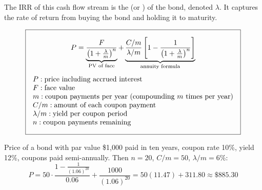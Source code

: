 \begin{center}
\end{center}

The IRR of this cash flow stream is the  (or ) of the bond, denoted $\lambda$. It captures the rate of return from buying the bond and holding it to maturity.

\[\boxed{\begin{gathered}
    P = \underbrace{\frac{F}{\left(1+\frac{\lambda}{m}\right)^n}}_{\text{PV of face}} + \underbrace{\frac{C/m}{\lambda/m}\left[1-\frac{1}{\left(1+\frac{\lambda}{m}\right)^n}\right]}_{\text{annuity formula}}\\[4pt]
    \begin{array}{@{}l@{}}
        P: \text{price including accrued interest}\\
        F: \text{face value}\\
        m: \text{coupon payments per year (compounding $m$ times per year)}\\
        C/m: \text{amount of each coupon payment}\\
        \lambda/m: \text{yield per coupon period}\\
        n: \text{coupon payments remaining}
    \end{array}
\end{gathered}}\]

\begin{example}
    Price of a bond with par value \$1,000 paid in ten years, coupon rate 10\%, yield 12\%, coupons paid semi-annually. Then $n = 20$, $C/m = 50$, $\lambda/m = 6\%$:
    \[P = 50\cdot\frac{1-\frac{1}{(1.06)^{20}}}{0.06} + \frac{1000}{(1.06)^{20}} = 50(11.47) + 311.80 \approx \$885.30\]
\end{example}

